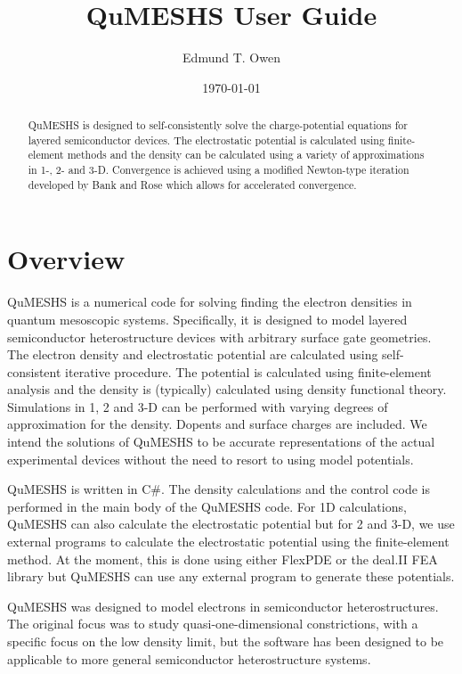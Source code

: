 \documentclass[12pt]{article}
\begin{document}
\title{QuMESHS User Guide}%
\author{Edmund T. Owen}%
\date{\today}%
\begin{abstract}
  QuMESHS is designed to self-consistently solve the charge-potential equations
  for layered semiconductor devices.  The electrostatic potential is calculated using
  finite-element methods and the density can be calculated using a variety of
  approximations in 1-, 2- and 3-D.  Convergence is achieved using a modified
  Newton-type iteration developed by Bank and Rose which allows for accelerated
  convergence.
\end{abstract}
\maketitle

\tableofcontents
\newpage


\section{Overview}

QuMESHS is a numerical code for solving finding the electron densities in quantum mesoscopic systems. Specifically, it is designed to model layered semiconductor heterostructure devices with arbitrary surface gate geometries. The electron density and electrostatic potential are calculated using self-consistent iterative procedure. The potential is calculated using finite-element analysis and the density is (typically) calculated using density functional theory. Simulations in 1, 2 and 3-D can be performed with varying degrees of approximation for the density. Dopents and surface charges are included. We intend the solutions of QuMESHS to be accurate representations of the actual experimental devices without the need to resort to using model potentials.

QuMESHS is written in C\#. The density calculations and the control code is performed in the main body of the QuMESHS code. For 1D calculations, QuMESHS can also calculate the electrostatic potential but for 2 and 3-D, we use external programs to calculate the electrostatic potential using the finite-element method. At the moment, this is done using either FlexPDE or the deal.II FEA library but QuMESHS can use any external program to generate these potentials.

QuMESHS was designed to model electrons in semiconductor heterostructures. The original focus was to study quasi-one-dimensional constrictions, with a specific focus on the low density limit, but the software has been designed to be applicable to more general semiconductor heterostructure systems.
\end{document}

